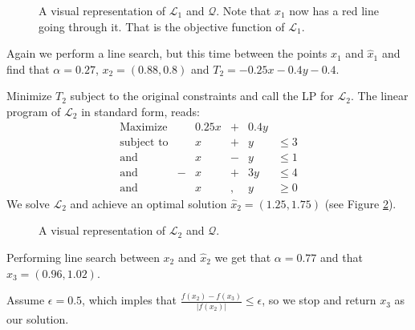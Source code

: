 \begin{figure}[ht!]
\centering

\caption{A visual representation of $\mathcal{L}_1$ and $\mathcal{Q}$.
         Note that $x_1$ now has a red line going through it. That is
         the objective function of $\mathcal{L}_1$.}
\label{fig:lp2}
\end{figure}

Again we perform a line search, but this time between the points $x_1$ and
$\hat{x}_1$ and find that $\alpha = 0.27$, $x_2 = (0.88, 0.8)$ and
$T_2 = -0.25x -0.4y -0.4$.

Minimize $T_2$ subject to the original constraints and call the LP for
$\mathcal{L}_2$.
The linear program of $\mathcal{L}_2$ in standard form, reads:
\[
\begin{array}{lcrcrl}
    \textrm{Maximize}   & & 0.25 x &+& 0.4 y & \\
    \textrm{subject to} & &      x &+&     y & \leq 3 \\
    \textrm{and}        & &      x &-&     y & \leq 1 \\
    \textrm{and}        &-&      x &+&   3 y & \leq 4 \\
    \textrm{and}        & &      x &,&     y & \geq 0
\end{array}
\]
We solve $\mathcal{L}_2$ and achieve an optimal solution $\hat{x}_2
= (1.25, 1.75)$ (see Figure \ref{fig:lp3}).
\begin{figure}[ht!]
\centering

\caption{A visual representation of $\mathcal{L}_2$ and $\mathcal{Q}$.}
\label{fig:lp3}
\end{figure}

Performing line search between $x_2$ and $\hat{x}_2$ we get that
$\alpha = 0.77$ and that $x_3 = (0.96, 1.02)$.


Assume $\epsilon = 0.5$, which imples that
$\frac{f(x_2) - f(x_3)}{|f(x_2)|} \leq \epsilon$, so we stop and return $x_3$
as our solution.
